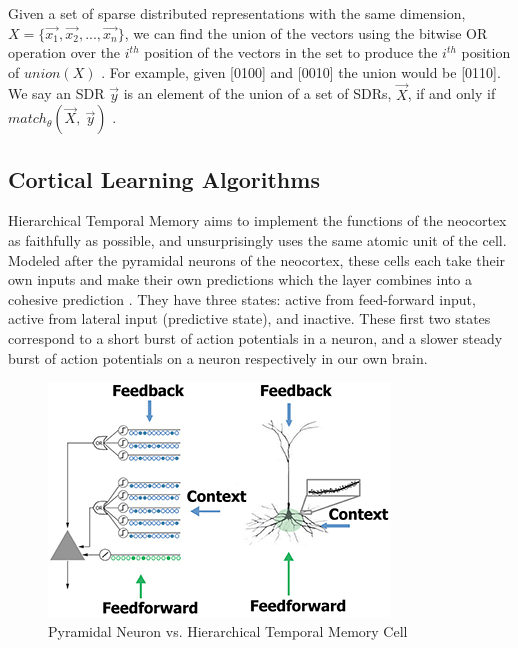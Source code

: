 \documentclass[oneside,12pt,openany]{book}
\begin{document}
	Given a set of sparse distributed representations with the same dimension, $X =\{\overrightarrow{x_{1}}, \overrightarrow{x_{2}}, ...,\overrightarrow{x_{n}}\}$, we can find the union of the vectors using the bitwise OR operation over the $i^{th}$ position of the vectors in the set to produce the $i^{th}$ position of $union(X)$ \cite{Properties}. For example, given [0100] and [0010] the union would be [0110]. We say an SDR $\overrightarrow{y}$ is an element of the union of a set of SDRs, $\overrightarrow{X}$, if and only if $match_{\theta}(\overrightarrow{X},\ \overrightarrow{y})$ \cite{Properties}.
	
	\subsection{Cortical Learning Algorithms}
	
	Hierarchical Temporal Memory aims to implement the functions of the neocortex as faithfully as possible, and unsurprisingly uses the same atomic unit of the cell. Modeled after the pyramidal neurons of the neocortex, these cells each take their own inputs and make their own predictions which the layer combines into a cohesive prediction \cite{Whitepaper}. They have three states: active from feed-forward input, active from lateral input (predictive state), and inactive. These first two states correspond to a short burst of action potentials in a neuron, and a slower steady burst of action potentials on a neuron respectively in our own brain.
	
	\begin{figure}[hbt!]
		\centering
		\includegraphics[width=.7\linewidth]{images/HTMCell.jpg}
		\caption[Pyramidal Neuron vs. Hierarchical Temporal Memory Cell]{Pyramidal Neuron vs. Hierarchical Temporal Memory Cell~\cite{TheHTMSpatialPooler}}
		\label{fig:HTMCell}
	\end{figure}
\end{document}
